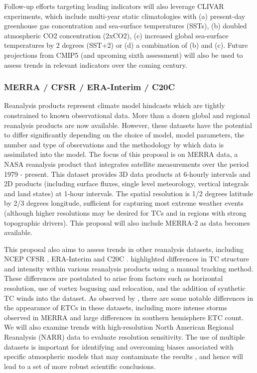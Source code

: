\documentclass[11pt]{article}
\newcommand\citep{\cite}
\newcommand\citet{\cite}
\begin{document}
Follow-up efforts targeting leading indicators will also leverage CLIVAR experiments, which include multi-year static climatologies with (a) present-day greenhouse gas concentration and sea-surface temperatures (SSTs), (b) doubled atmospheric CO2 concentration (2xCO2), (c) increased global sea-surface temperatures by 2 degrees (SST+2) or (d) a combination of (b) and (c).  Future projections from CMIP5 (and upcoming sixth assessment) will also be used to assess trends in relevant indicators over the coming century.

\subsubsection*{MERRA / CFSR / ERA-Interim / C20C} \label{sec:MERRA}

Reanalysis products represent climate model hindcasts which are tightly constrained to known observational data.  More than a dozen global and regional reanalysis products are now available.  However, these datasets have the potential to differ significantly depending on the choice of model,  model parameters, the number and type of observations and the methodology by which data is assimilated into the model.  The focus of this proposal is on MERRA \citep{rienecker2011merra} data, a NASA reanalysis product that integrates satellite measurements over the period 1979 - present.  This dataset provides 3D data products at 6-hourly intervals and 2D products (including surface fluxes, single level meteorology, vertical integrals and land states) at 1-hour intervals.  The spatial resolution is 1/2 degrees latitude by 2/3 degrees longitude, sufficient for capturing most extreme weather events (although higher resolutions may be desired for TCs and in regions with strong topographic drivers).  This proposal will also include MERRA-2 as data becomes available.

This proposal also aims to assess trends in other reanalysis datasets, including NCEP CFSR \citep{saha2010ncep}, ERA-Interim \citep{simmons2007era} and C20C \citep{compo2011twentieth}. \citet{Schenkel2012} highlighted differences in TC structure and intensity within various reanalysis products using a manual tracking method. These differences are postulated to arise from factors such as horizontal resolution, use of vortex bogusing and relocation, and the addition of synthetic TC winds into the dataset. As observed by \cite{hodges2011comparison}, there are some notable differences in the appearance of ETCs in these datasets, including more intense storms observed in MERRA and large differences in southern hemisphere ETC count.  We will also examine trends with high-resolution North American Regional Reanalysis (NARR) data to evaluate resolution sensitivity.  The use of multiple datasets is important for identifying and overcoming biases associated with specific atmospheric models that may contaminate the results \citep{jun2008spatial}, and hence will lead to a set of more robust scientific conclusions.
\end{document}
